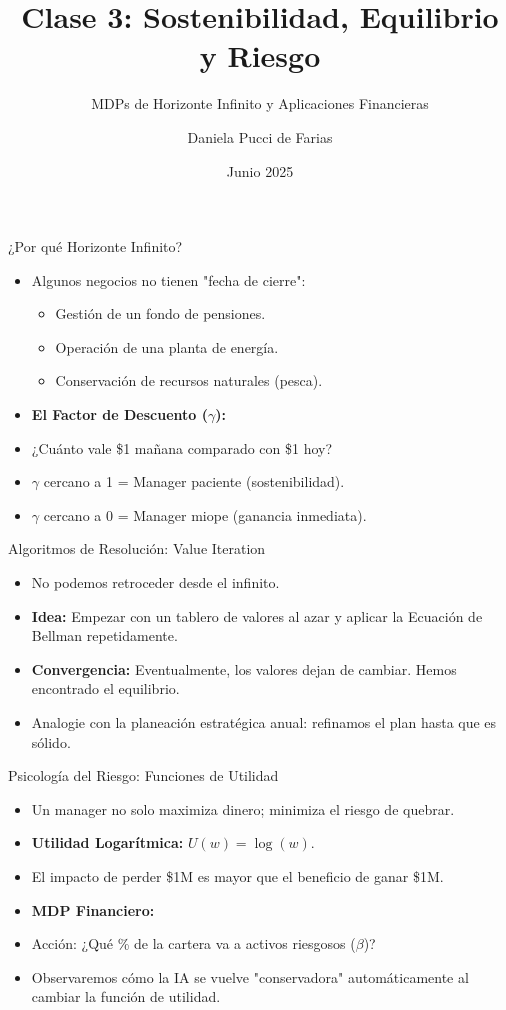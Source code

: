 \documentclass{beamer}
\title{Clase 3: Sostenibilidad, Equilibrio y Riesgo}
\subtitle{MDPs de Horizonte Infinito y Aplicaciones Financieras}
\author{Daniela Pucci de Farias}
\institute{Universidad Torcuato Di Tella}
\date{Junio 2025}
\begin{document}
\frame{\titlepage}

\begin{frame}{¿Por qué Horizonte Infinito?}
\begin{itemize}
    \item Algunos negocios no tienen "fecha de cierre":
    \begin{itemize}
        \item Gestión de un fondo de pensiones.
        \item Operación de una planta de energía.
        \item Conservación de recursos naturales (pesca).
    \end{itemize}
    \item \textbf{El Factor de Descuento ($\gamma$):}
    \item ¿Cuánto vale \$1 mañana comparado con \$1 hoy?
    \item $\gamma$ cercano a 1 = Manager paciente (sostenibilidad).
    \item $\gamma$ cercano a 0 = Manager miope (ganancia inmediata).
\end{itemize}
\end{frame}

\begin{frame}{Algoritmos de Resolución: Value Iteration}
\begin{itemize}
    \item No podemos retroceder desde el infinito.
    \item \textbf{Idea:} Empezar con un tablero de valores al azar y aplicar la Ecuación de Bellman repetidamente.
    \item \textbf{Convergencia:} Eventualmente, los valores dejan de cambiar. Hemos encontrado el equilibrio.
    \item Analogie con la planeación estratégica anual: refinamos el plan hasta que es sólido.
\end{itemize}
\end{frame}

\begin{frame}{Psicología del Riesgo: Funciones de Utilidad}
\begin{itemize}
    \item Un manager no solo maximiza dinero; minimiza el riesgo de quebrar.
    \item \textbf{Utilidad Logarítmica:} $U(w) = \log(w)$.
    \item El impacto de perder \$1M es mayor que el beneficio de ganar \$1M.
    \item \textbf{MDP Financiero:}
    \item Acción: ¿Qué \% de la cartera va a activos riesgosos ($\beta$)?
    \item Observaremos cómo la IA se vuelve "conservadora" automáticamente al cambiar la función de utilidad.
\end{itemize}
\end{frame}
\end{document}
